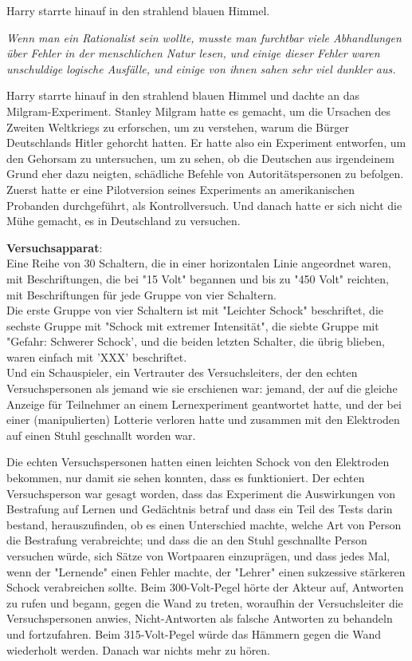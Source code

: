 {Harry starrte hinauf in den strahlend blauen Himmel.

\emph{Wenn man ein Rationalist sein wollte, musste man furchtbar viele Abhandlungen über Fehler in der menschlichen Natur lesen, und einige dieser Fehler waren unschuldige logische Ausfälle, und einige von ihnen sahen sehr viel dunkler aus.}

Harry starrte hinauf in den strahlend blauen Himmel und dachte an das Milgram-Experiment. Stanley Milgram hatte es gemacht, um die Ursachen des Zweiten Weltkriegs zu erforschen, um zu verstehen, warum die Bürger Deutschlands Hitler gehorcht hatten. Er hatte also ein Experiment entworfen, um den Gehorsam zu untersuchen, um zu sehen, ob die Deutschen aus irgendeinem Grund eher dazu neigten, schädliche Befehle von Autoritätspersonen zu befolgen. Zuerst hatte er eine Pilotversion seines Experiments an amerikanischen Probanden durchgeführt, als Kontrollversuch. Und danach hatte er sich nicht die Mühe gemacht, es in Deutschland zu versuchen.

\textbf{Versuchsapparat}:\\ Eine Reihe von 30 Schaltern, die in einer horizontalen Linie angeordnet waren, mit Beschriftungen, die bei "15 Volt" begannen und bis zu "450 Volt" reichten, mit Beschriftungen für jede Gruppe von vier Schaltern.\\ Die erste Gruppe von vier Schaltern ist mit "Leichter Schock" beschriftet, die sechste Gruppe mit "Schock mit extremer Intensität", die siebte Gruppe mit "Gefahr: Schwerer Schock', und die beiden letzten Schalter, die übrig blieben, waren einfach mit 'XXX' beschriftet.\\ Und ein Schauspieler, ein Vertrauter des Versuchsleiters, der den echten Versuchspersonen als jemand wie sie erschienen war: jemand, der auf die gleiche Anzeige für Teilnehmer an einem Lernexperiment geantwortet hatte, und der bei einer (manipulierten) Lotterie verloren hatte und zusammen mit den Elektroden auf einen Stuhl geschnallt worden war.

Die echten Versuchspersonen hatten einen leichten Schock von den Elektroden bekommen, nur damit sie sehen konnten, dass es funktioniert. Der echten Versuchsperson war gesagt worden, dass das Experiment die Auswirkungen von Bestrafung auf Lernen und Gedächtnis betraf und dass ein Teil des Tests darin bestand, herauszufinden, ob es einen Unterschied machte, welche Art von Person die Bestrafung verabreichte; und dass die an den Stuhl geschnallte Person versuchen würde, sich Sätze von Wortpaaren einzuprägen, und dass jedes Mal, wenn der "Lernende" einen Fehler machte, der "Lehrer" einen sukzessive stärkeren Schock verabreichen sollte. Beim 300-Volt-Pegel hörte der Akteur auf, Antworten zu rufen und begann, gegen die Wand zu treten, woraufhin der Versuchsleiter die Versuchspersonen anwies, Nicht-Antworten als falsche Antworten zu behandeln und fortzufahren. Beim 315-Volt-Pegel würde das Hämmern gegen die Wand wiederholt werden. Danach war nichts mehr zu hören.

}

